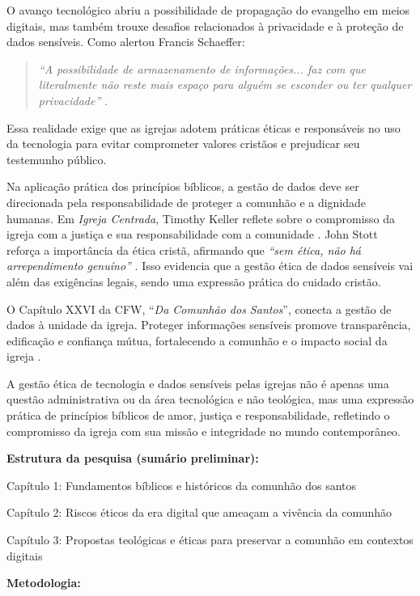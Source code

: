 \documentclass[12pt,a4paper]{article}
\begin{document}
O avanço tecnológico abriu a possibilidade de propagação do evangelho em meios digitais, mas também trouxe desafios relacionados à privacidade e à proteção de dados sensíveis. Como alertou Francis Schaeffer:

\begin{quote}
\textit {``A possibilidade de armazenamento de informações... faz com que literalmente não reste mais espaço para alguém se esconder ou ter qualquer privacidade''} \cite[p.~180]{schaeffer2002}.
\end{quote}

Essa realidade exige que as igrejas adotem práticas éticas e responsáveis no uso da tecnologia para evitar comprometer valores cristãos e prejudicar seu testemunho público.

Na aplicação prática dos princípios bíblicos, a gestão de dados deve ser direcionada pela responsabilidade de proteger a comunhão e a dignidade humanas. Em \textit{Igreja Centrada}, Timothy Keller reflete sobre o compromisso da igreja com a justiça e sua responsabilidade com a comunidade \cite[p.~209]{keller2014}. John Stott reforça a importância da ética cristã, afirmando que \textit {``sem ética, não há arrependimento genuíno''} \cite[p.~51]{stott2008}. Isso evidencia que a gestão ética de dados sensíveis vai além das exigências legais, sendo uma expressão prática do cuidado cristão.

O Capítulo XXVI da CFW, ``\textit{Da Comunhão dos Santos}'', conecta a gestão de dados à unidade da igreja. Proteger informações sensíveis promove transparência, edificação e confiança mútua, fortalecendo a comunhão e o impacto social da igreja \cite{cfw}.

A gestão ética de tecnologia e dados sensíveis pelas igrejas não é apenas uma questão administrativa ou da área tecnológica e não teológica, mas uma expressão prática de princípios bíblicos de amor, justiça e responsabilidade, refletindo o compromisso da igreja com sua missão e integridade no mundo contemporâneo.

\noindent
\textbf{Estrutura da pesquisa (sumário preliminar):}

\noindent
Capítulo 1: Fundamentos bíblicos e históricos da comunhão dos santos

\noindent
Capítulo 2: Riscos éticos da era digital que ameaçam a vivência da comunhão

\noindent
Capítulo 3: Propostas teológicas e éticas para preservar a comunhão em contextos digitais

\noindent
\textbf{Metodologia:}
\end{document}

